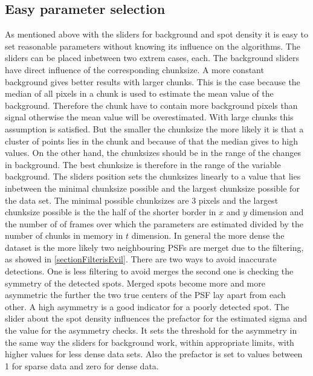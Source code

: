 \subsection{Easy parameter selection}
As mentioned above with the sliders for background and spot density it is easy to set reasonable parameters without knowing its influence on the algorithms. The sliders can be placed inbetween two extrem cases, each.\newline
The background sliders have direct influence of the corresponding chunksize. A more constant background gives better results with larger chunks. This is the case because the median of all pixels in a chunk is used to estimate the mean value of the background. Therefore the chunk have to contain more background pixels than signal otherwise the mean value will be overestimated. With large chunks this assumption is satisfied. But the smaller the chunksize the more likely it is that a cluster of points lies in the chunk and because of that the median gives to high values. On the other hand, the chunksizes should be in the range of the changes in background. The best chunksize is therefore in the range of the variable background. The sliders position sets the chunksizes linearly to a value that lies inbetween the minimal chunksize possible and the largest chunksize possible for the data set. The minimal possible chunksizes are 3 pixels and the largest chunksize possible is the the half of the shorter border in $x$ and $y$ dimension and the number of of frames over which the parameters are estimated divided by the number of chunks in memory in $t$ dimension.\newline 
In general the more dense the dataset is the more likely two neighbouring PSFs are merget due to the filtering, as showed in \ref{sectionFilterisEvil}. There are two ways to avoid inaccurate detections. One is less filtering to avoid merges the second one is checking the symmetry of the detected spots. Merged spots become more and more asymmetric the further the two true centers of the PSF lay apart from each other. A high asymmetry is a good indicator for a poorly detected spot.
The slider about the spot density influences the prefactor for the estimated sigma and the value for the asymmetry checks. It sets the threshold for the asymmetry in the same way the sliders for background work, within appropriate limits, with higher values for less dense data sets. Also the prefactor is set to values between 1 for sparse data and zero for dense data.